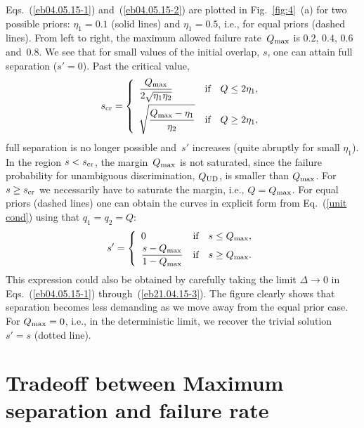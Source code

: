 \documentclass[aps,pra,twocolumn,showpacs]{revtex4-1}
\begin{document}
{Eqs.~(\ref{eb04.05.15-1}) and~(\ref{eb04.05.15-2}) are plotted in Fig.~\ref{fig:4}~(a) for two possible priors: $\eta_1=0.1$ (solid lines) and $\eta_1=0.5$, i.e., for equal priors  (dashed lines). From left to right, the maximum allowed failure rate~$Q_{\rm max}$ is $0.2$, $0.4$, $0.6$ and~$0.8$. We see that for small values of the initial overlap, $s$, one can attain full separation ($s'=0$). Past the critical value,
%
\begin{equation}
s_{\rm cr}=
\left\{
\begin{array}{lll}
\displaystyle{Q_{\rm max}\over 2\sqrt{\eta_1\eta_2}}&\mbox{if}&\displaystyle Q\le 2\eta_1,\\[.9em]
\displaystyle
\sqrt{Q_{\rm max}-\eta_1\over\eta_2}
&\mbox{if}&\displaystyle Q\ge 2\eta_1,
\end{array}
\right.
\end{equation}
%
 full separation is no longer possible and~$s'$ increases (quite abruptly for small $\eta_1$). In the region $s<s_{\rm cr}$, the margin~$Q_{\rm max}$ is not saturated,  since the failure probability for unambiguous discrimination, $Q_{\rm UD}$, is  smaller than $Q_{\rm max}$. For $s\ge s_{\rm cr}$ we necessarily have to saturate the margin, i.e., $Q=Q_{\rm max}$. For equal priors (dashed lines) one can obtain the curves in explicit form from Eq.~(\ref{unit cond}) using that $q_1=q_2=Q$:
%
\begin{equation}
s'=
\left\{
\begin{array}{lll}
\displaystyle0 &\mbox{if}& s\le Q_{\rm max},\\[.2em]
\displaystyle
{s-Q_{\rm max}\over 1-Q_{\rm max}}
&\mbox{if}&\displaystyle s\ge Q_{\rm max}.
\end{array}
\right.
\label{tradeoff equal}
\end{equation}
% 
This expression could also be obtained by carefully taking the limit $\Delta\to 0$ in Eqs.~(\ref{eb04.05.15-1})  through~(\ref{eb21.04.15-3}).
The figure clearly shows that separation becomes less demanding as we move away from the equal prior case. For \mbox{$Q_{\rm max}=0$}, i.e., in the deterministic limit, we recover the trivial solution $s'=s$ (dotted line).


\section{Tradeoff between Maximum separation and failure rate}\label{tradeoff}

}
\end{document}
